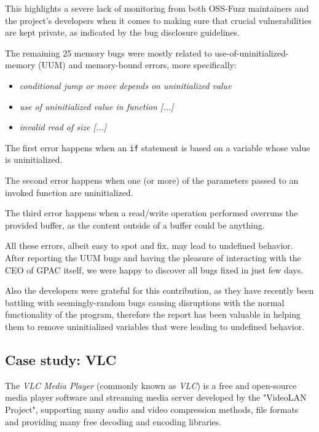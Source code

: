 This highlights a severe lack of monitoring from both OSS-Fuzz maintainers and the project's developers when it comes to making sure that crucial vulnerabilities are kept private, as indicated by the bug disclosure guidelines.

The remaining 25 memory bugs were mostly related to use-of-uninitialized-memory (UUM) and memory-bound errors, more specifically:
\begin{itemize}
    \item \textit{conditional jump or move depends on uninitialized value}
    \item \textit{use of uninitialized value in function [...]}
    \item \textit{invalid read of size [...]}
\end{itemize}
The first error happens when an \verb|if| statement is based on a variable whose value is uninitialized.

The second error happens when one (or more) of the parameters passed to an invoked function are uninitialized.

The third error happens when a read/write operation performed overruns the provided buffer, as the content outside of a buffer could be anything.

All these errors, albeit easy to spot and fix, may lead to undefined behavior.
After reporting the UUM bugs and having the pleasure of interacting with the CEO of GPAC itself, we were happy to discover all bugs fixed in just few days.

Also the developers were grateful for this contribution, as they have recently been battling with seemingly-random bugs causing disruptions with the normal functionality of the program, therefore the report has been valuable in helping them to remove uninitialized variables that were leading to undefined behavior.


\newpage
\subsection{Case study: VLC}
The \textit{VLC Media Player} (commonly known as \textit{VLC}) \cite{vlc} is a free and open-source media player software and streaming media server developed by the "VideoLAN Project", supporting many audio and video compression methods, file formats and providing many free decoding and encoding libraries.

